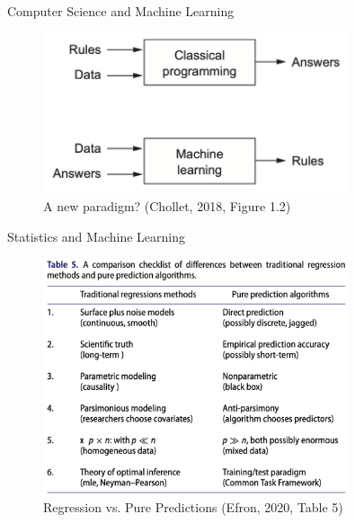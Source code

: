 \documentclass[10pt,handout]{beamer}
\begin{document}
\begin{frame}{Computer Science and Machine Learning}

\begin{figure}[h]
\caption{A new paradigm? (Chollet, 2018, Figure 1.2)}
\centering
\includegraphics[width=0.8\textwidth]{figs/fig1_2_chollet.png}
\end{figure}

\end{frame}


\begin{frame}{Statistics and Machine Learning}

\begin{figure}[h]
\caption{Regression vs. Pure Predictions (Efron, 2020, Table 5)}
\centering
\includegraphics[width=0.8\textwidth]{figs/table5.png}
\end{figure}

\end{frame}
\end{document}
